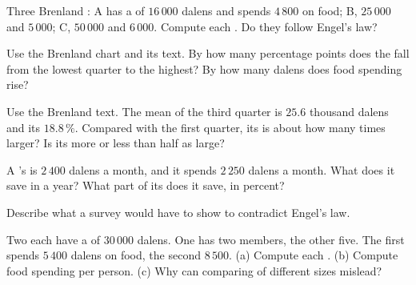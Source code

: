 \begin{exercise}[$\star\star$]\label{exo:g7:households:5}
Three Brenland : A has a  of $16\,000$ dalens and spends $4\,800$ on
food; B, $25\,000$ and $5\,000$; C, $50\,000$ and $6\,000$. Compute each . Do they
follow Engel's law?
\end{exercise}

\begin{exercise}[$\star\star$]\label{exo:g7:households:6}
Use the Brenland chart and its text. By how many percentage points does the  fall from
the lowest quarter to the highest? By how many dalens does food spending rise?
\end{exercise}

\begin{exercise}[$\star\star$]\label{exo:g7:households:7}
Use the Brenland text. The mean  of the third quarter is $25.6$ thousand
dalens and its  $18.8\,\%$. Compared with the first quarter, its  is about how
many times larger? Is its  more or less than half as large?
\end{exercise}

\begin{exercise}[$\star\star$]\label{exo:g7:households:8}
A 's  is $2\,400$ dalens a month, and it spends $2\,250$ dalens a month.
What does it save in a year? What part of its  does it save, in percent?
\end{exercise}

\begin{exercise}[$\star\star$]\label{exo:g7:households:9}
Describe what a survey would have to show to contradict Engel's law.
\end{exercise}

\begin{exercise}[$\star\star\star$]\label{exo:g7:households:10}
Two  each have a  of $30\,000$ dalens. One has two members, the other
five. The first spends $5\,400$ dalens on food, the second $8\,500$. (a) Compute each .
(b) Compute food spending per person. (c) Why can comparing  of different sizes mislead?
\end{exercise}

